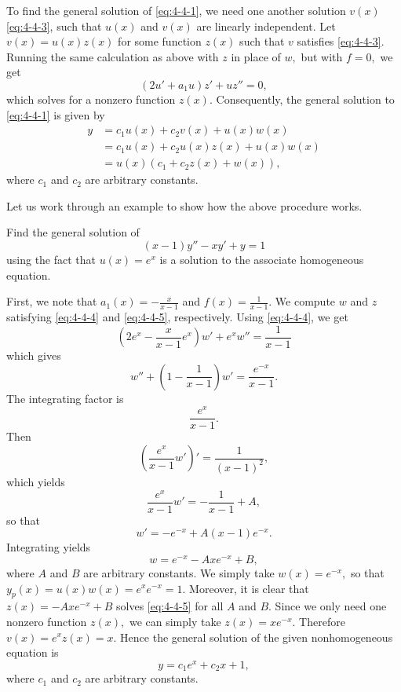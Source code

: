 To find the general solution of \eqref{eq:4-4-1}, we need one another solution $v(x)$ \eqref{eq:4-4-3}, such that $u(x)$ and  $v(x)$ are linearly independent. Let $v(x) = u(x) z(x)$
for some function $z(x)$ such that $v$ satisfies \eqref{eq:4-4-3}. Running the same calculation as above with $z$ in place of $w,$ but with $f=0,$ we get 
\begin{equation}\label{eq:4-4-5}
	(2u'+a_1u)z'+ uz'' = 0,
	\end{equation} which solves for a nonzero function $z(x).$ Consequently, the general solution to \eqref{eq:4-4-1} is given by 
\[\begin{split}
	y &= c_1u(x)+ c_2v(x) + u(x)w(x)\\
	&=c_1u(x)+ c_2u(x) z(x) + u(x)w(x)\\
	&= u(x) (c_1 + c_2 z(x) + w(x)),
\end{split}\] where $c_1$ and $c_2$ are arbitrary constants.

Let us work through an example to show how the above procedure  works.
\begin{example}
	Find the general solution of 
	\[(x-1)y''-x y'+y =1\] using the fact that $u(x) = e^x$ is a solution to the associate homogeneous equation.
\end{example}

\begin{solution}
First, we note that \(a_1(x) = -\frac{x}{x-1}\) and \(f(x) = \frac{1}{x-1}\). We compute \(w\) and \(z\) satisfying \eqref{eq:4-4-4} and \eqref{eq:4-4-5}, respectively. Using \eqref{eq:4-4-4}, we get
\[\left(2e^x-\frac{x}{x-1} e^x\right)w' + e^x w'' = \frac{1}{x-1}\] which gives
\[w''+\left(1-\frac{1}{x-1}\right)w' = \frac{e^{-x}}{x-1}.\] The integrating factor is
\[\frac{e^x}{x-1}.\] Then
\[\left(\frac{e^x}{x-1} w'\right)'= \frac{1}{(x-1)^2},\] which yields
\[\frac{e^x}{x-1} w' = -\frac{1}{x-1}+A,\] so that 
\[w' = -e^{-x} +A (x-1)e^{-x}.\] Integrating yields
\[w = e^{-x} -Axe^{-x} + B,\] where $A$ and $B$ are arbitrary constants. We simply take $w(x) = e^{-x},$ so that $y_p(x) = u(x)w(x) = e^x e^{-x} = 1.$ Moreover,  it is  clear that \(z(x)=-Axe^{-x} + B\) solves \eqref{eq:4-4-5} for all $A$ and $B$. Since we only need one nonzero function  $z(x),$ we can simply take $z(x) = xe^{-x}.$ Therefore $v(x) = e^x z(x) = x.$
Hence the general solution of the given nonhomogeneous equation is 
\[y = c_1e^x + c_2 x +1,\] where $c_1$ and $c_2$ are arbitrary constants.
\end{solution}

